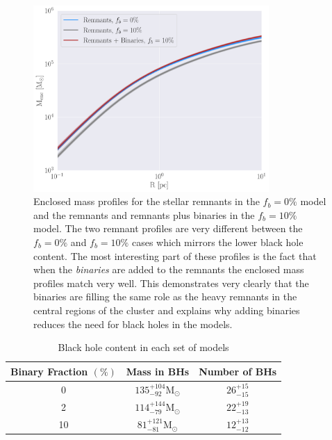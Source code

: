 \begin{figure}
	\centering
	\includegraphics[width=0.8\textwidth]{figures/mass_enc_comp.png}
	\caption{Enclosed mass profiles for the stellar remnants in the $f_b =0\%$ model and the
		remnants and remnants plus binaries in the $f_b =10\%$ model. The two remnant
		profiles are very different between the $f_b = 0\%$ and $f_b = 10\%$ cases which
		mirrors the lower black hole content. The most interesting part of these profiles is
		the fact that when the \emph{binaries} are added to the remnants the enclosed mass
		profiles match very well. This demonstrates very clearly that the binaries are
		filling the same role as the heavy remnants in the central regions of the cluster
		and explains why adding binaries reduces the need for black holes in the models.}
	\label{fig:mass_enc_comp}
\end{figure}


\begin{table}
	\centering
	\caption{Black hole content in each set of models}
	\begin{tabular}{c c c}
		\hline
		Binary Fraction $(\%)$ & Mass in BHs                         & Number of BHs    \\
		\hline
		0                      & $135^{+104}_{-92} \mathrm{M}_\odot$ & $26^{+15}_{-15}$ \\
		2                      & $114^{+144}_{-79} \mathrm{M}_\odot$ & $22^{+19}_{-13}$ \\
		10                     & $81 ^{+121}_{-81} \mathrm{M}_\odot$ & $12^{+13}_{-12}$ \\
		\hline
	\end{tabular}
	\label{tab:BH_contents}
\end{table}


